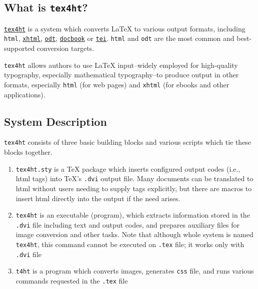 \hypertarget{what-is-tex4ht}{%
\subsection{\texorpdfstring{What is
\texttt{tex4ht}?}{What is tex4ht?}}\label{what-is-tex4ht}}

\href{https://www.tug.org/tex4ht/}{\texttt{tex4ht}} is a system which
converts LaTeX to various output formats, including \texttt{html},
\href{http://en.wikipedia.org/wiki/XHTML}{\texttt{xhtml}},
\href{http://en.wikipedia.org/wiki/OpenDocument}{\texttt{odt}},
\href{http://en.wikipedia.org/wiki/DocBook}{\texttt{docbook}} or
\href{http://en.wikipedia.org/wiki/Text_Encoding_Initiative}{\texttt{tei}}.
\texttt{html} and \texttt{odt} are the most common and best-supported
conversion targets.

\texttt{tex4ht} allows authors to use LaTeX input--widely employed for
high-quality typography, especially mathematical typography--to produce
output in other formats, especially \texttt{html} (for web pages) and
\texttt{xhtml} (for ebooks and other applications).

\hypertarget{system-description}{%
\subsection{System Description}\label{system-description}}

\texttt{tex4ht} consists of three basic building blocks and various
scripts which tie these blocks together.

\begin{enumerate}
\def\labelenumi{\arabic{enumi}.}
\item
  \texttt{tex4ht.sty} is a TeX package which inserts configured output
  codes (i.e., html tags) into TeX's \texttt{.dvi} output file. Many
  documents can be translated to html without users needing to supply
  tags explicitly, but there are macros to insert html directly into the
  output if the need arises.
\item
  \texttt{tex4ht} is an executable (program), which extracts information
  stored in the \texttt{.dvi} file including text and output codes, and
  prepares auxiliary files for image conversion and other tasks. Note
  that although whole system is named \texttt{tex4ht}, this command
  cannot be executed on \texttt{.tex} file; it works only with
  \texttt{.dvi} file
\item
  \texttt{t4ht} is a program which converts images, generates
  \texttt{css} file, and runs various commands requested in the
  \texttt{.tex} file
\end{enumerate}

